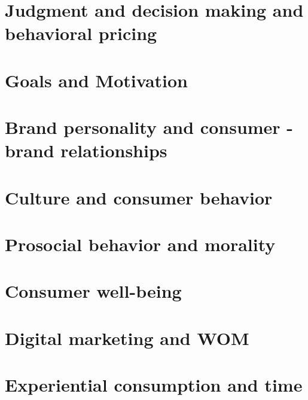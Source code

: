 \documentclass[
]{book}
\begin{document}
\hypertarget{judgment-and-decision-making-and-behavioral-pricing}{%
\section{Judgment and decision making and behavioral pricing}\label{judgment-and-decision-making-and-behavioral-pricing}}

\hypertarget{goals-and-motivation}{%
\section{Goals and Motivation}\label{goals-and-motivation}}

\hypertarget{brand-personality-and-consumer--brand-relationships}{%
\section{Brand personality and consumer -brand relationships}\label{brand-personality-and-consumer--brand-relationships}}

\hypertarget{culture-and-consumer-behavior}{%
\section{Culture and consumer behavior}\label{culture-and-consumer-behavior}}

\hypertarget{prosocial-behavior-and-morality}{%
\section{Prosocial behavior and morality}\label{prosocial-behavior-and-morality}}

\hypertarget{consumer-well-being}{%
\section{Consumer well-being}\label{consumer-well-being}}

\hypertarget{digital-marketing-and-wom}{%
\section{Digital marketing and WOM}\label{digital-marketing-and-wom}}

\hypertarget{experiential-consumption-and-time}{%
\section{Experiential consumption and time}\label{experiential-consumption-and-time}}
\end{document}
